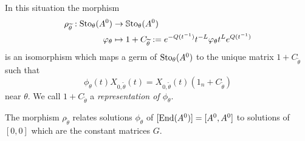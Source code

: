 \begin{prop} \label{prop:representation}
  In this situation the morphism
  \begin{align*}
    \rho_{\widetilde\theta}:\operatorname{Sto}_\theta(A^0)&\to\operatorname{\mathbb{S}to}_\theta(A^0)
    \\\varphi_\theta
    &\mapsto 1+C_{\widetilde\theta}
    :=e^{-Q(t^{-1})}t^{-L} \varphi_\theta t^L e^{Q(t^{-1})}
  \end{align*}
  is an isomorphism which maps a germ of $\operatorname{Sto}_\theta(A^0)$ to the unique
  matrix $1+C_{\tilde\theta}$ such that
  \begin{equation} \label{eq:representation}
    \phi_\theta(t)X_{0,\tilde\theta}(t)
    =X_{0,\tilde\theta}(t)(1_n+C_{\tilde\theta})
  \end{equation}
  near $\theta$.  We call $1+C_{\tilde\theta}$ a \emph{representation of
  $\phi_\theta$}.
  \begin{s-rem}
    The morphism $\rho_{\tilde\theta}$ relates solutions $\phi_\theta$ of
    $[\operatorname{End}(A^0)]=[A^0,A^0]$ to solutions of $[0,0]$ which are the constant
    matrices $G$.
  \end{s-rem}
\end{prop}
